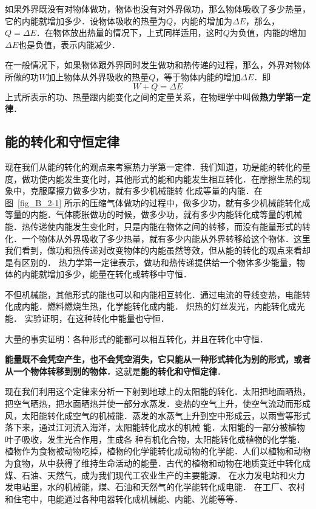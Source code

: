 如果外界既没有对物体做功，物体也没有对外界做功，那么物体吸收了多少热量，它的内能就增加多少．设物体吸收的热量为$Q$，内能的增加为$\Delta E$，那么，$Q=\Delta E$．在物体放出热量的情况下，上式同样适用，这时$Q$为负值，内能的增加$\Delta E$也是负值，表示内能减少．

在一般情况下，如果物体跟外界同时发生做功和热传递的过程，那么，外界对物体所做的功$W$加上物体从外界吸收的热量$Q$，等于物体内能的增加$\Delta E$．即
\[W+Q=\Delta E\]
上式所表示的功、热量跟内能变化之间的定量关系，在物理学中叫做\textbf{热力学第一定律}．

\subsection{能的转化和守恒定律} 
现在我们从能的转化的观点来考察热力学第一定律．我们知道，功是能的转化的量度，做功使内能发生变化时，其他形式的能和内能发生相互转化．在摩擦生热的现象中，克服摩擦力做多少功，就有多少机械能转
化成等量的内能．在图~\ref{fig_B_2-1} 所示的压缩气体做功的过程中，做多少功，就有多少机械能转化成等量的内能．气体膨胀做功的时候，做多少功，就有多少内能转化成等量的机械能．热传递使内能发生变化时，只是内能在物体之间的转移，而没有能量形式的转化．一个物体从外界吸收了多少热量，就有多少内能从外界转移给这个物体．这里我们看到，做功和热传递对改变物体的内能虽然等效，但从能的转化的观点来看却是有区别的．
热力学第一定律表示，做功和热传递提供给一个物体多少能量，物体的内能就增加多少，能量在转化或转移中守恒．

不但机械能，其他形式的能也可以和内能相互转化．通过电流的导线变热，电能转化成内能．燃料燃烧生热，化学能转化成内能．
炽热的灯丝发光，内能转化成光能．
实验证明，在这种转化中能量也守恒．

大量的事实证明：各种形式的能都可以相互转化，并且在转化中守恒．


\textbf{能量既不会凭空产生，也不会凭空消失，它只能从一种形式转化为别的形式，或者从一个物体转移到别的物体．}这就是\textbf{能的转化和守恒定律}．

现在我们利用这个定律来分析一下射到地球上的太阳能的转化．太阳把地面晒热，把空气晒热，把水面晒热并使一部分水蒸发．变热的空气上升，使空气流动而形成风，太阳能转化成空气的机械能．蒸发的水蒸气上升到空中形成云，以雨雪等形式落下来，通过江河流入海洋，太阳能转化成水的机械
能．太阳能的一部分被植物叶子吸收，发生光合作用，生成各
种有机化合物，太阳能转化成植物的化学能．植物作为食物被动物吃掉，植物的化学能转化成动物的化学能．人们以植物和动物为食物，从中获得了维持生命活动的能量．古代的植物和动物在地质变迁中转化成煤、石油、天然气，成为我们现代工农业生产的主要能源．
在水力发电站和火力发电站里，水的机械能，煤、石油和天然气的化学能转化成电能．
在工厂、农村和住宅中，电能通过各种电器转化成机械能、内能、光能等等．

